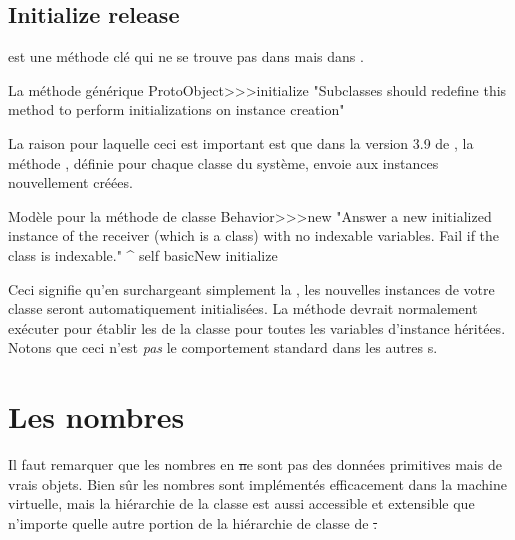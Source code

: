 \documentclass[a4paper,10pt,twoside]{book}
\begin{document}

\subsection{Initialize release}

 est une m\'ethode cl\'e qui ne se trouve pas dans  mais dans .

\begin{method}{La m\'ethode g\'en\'erique }
ProtoObject>>>initialize
    "Subclasses should redefine this method to perform initializations on instance creation"
\end{method}

La raison pour laquelle ceci est important est que dans la version 3.9 de \sq, la m\'ethode , d\'efinie pour chaque classe du syst\`eme, envoie  aux instances nouvellement cr\'e\'ees.

\begin{method}{Mod\`ele pour la m\'ethode de classe }
Behavior>>>new
    "Answer a new initialized instance of the receiver (which is a class) with no indexable
    variables. Fail if the class is indexable."
    ^ self basicNew initialize
\end{method}

Ceci signifie qu'en surchargeant simplement la  , les nouvelles instances de votre classe seront automatiquement initialis\'ees. La m\'ethode  devrait normalement ex\'ecuter  pour \'etablir les  de la classe pour toutes les variables d'instance h\'erit\'ees.
Notons que ceci n'est \emph{pas} le comportement standard dans les autres \st{}s.

\section{Les nombres}
\label{sec:Number}
Il faut remarquer que les nombres en \st ne sont pas des donn\'ees primitives mais de vrais objets. Bien s\^ur les nombres sont impl\'ement\'es efficacement dans la machine virtuelle, mais la hi\'erarchie de la classe  est aussi accessible et extensible que n'importe quelle autre portion de la hi\'erarchie de classe de \st.
\end{document}
